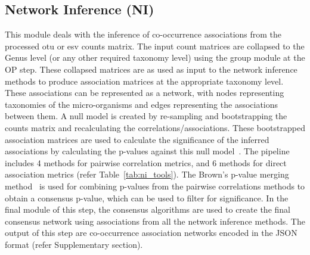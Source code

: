   \subsection*{Network Inference (NI)}
  \vspace{-5mm}
  This module deals with the inference of co-occurrence associations from the processed \ac{otu} or \ac{esv} counts matrix.
  The input count matrices are collapsed to the Genus level (or any other required taxonomy level) using the group module at the OP step.
  These collapsed matrices are as used as input to the network inference methods to produce association matrices at the appropriate taxonomy level.
  These associations can be represented as a network, with nodes representing taxonomies of the micro-organisms and edges representing the associations between them.
  A null model is created by re-sampling and bootstrapping the counts matrix and recalculating the correlations/associations.
  These bootstrapped association matrices are used to calculate the significance of the inferred associations by calculating the p-values against this null model~\cite{Watts2018}.
  The pipeline includes 4 methods for pairwise correlation metrics, and 6 methods for direct association metrics (refer Table~\ref{tab:ni_tools}).
  The Brown's p-value merging method~\cite{brown_400_1975} is used for combining p-values from the pairwise correlations methods to obtain a consensus p-value, which can be used to filter for significance.
  In the final module of this step, the consensus algorithms are used to create the final consensus network using associations from all the network inference methods.
  The output of this step are co-occurrence association networks encoded in the JSON format (refer Supplementary section).

